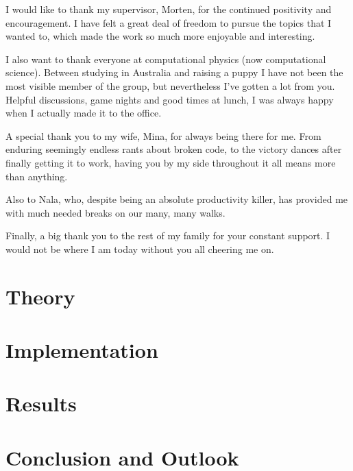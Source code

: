 \documentclass[twoside,english]{uiofysmaster}
\begin{document}
\begin{acknowledgements}
  I would like to thank my supervisor, Morten, for the continued positivity and
  encouragement. I have felt a great deal of freedom to pursue the topics that I
  wanted to, which made the work so much more enjoyable and interesting.

  I also want to thank everyone at computational physics (now computational
science). Between studying in Australia and raising a puppy I have not been the
most visible member of the group, but nevertheless I've gotten a lot from you.
Helpful discussions, game nights and good times at lunch, I was always happy
when I actually made it to the office.

  A special thank you to my wife, Mina, for always being there for me. From
  enduring seemingly endless rants about broken code, to the victory dances after
  finally getting it to work, having you by my side throughout it all means more
  than anything.

  Also to Nala, who, despite being an absolute productivity killer, has provided
  me with much needed breaks on our many, many walks.

  Finally, a big thank you to the rest of my family for your constant support. I
would not be where I am today without you all cheering me on.
\end{acknowledgements}

\tableofcontents

\listoffigures
\begingroup
\let\clearpage\relax
\listoftables
\endgroup



\part{Theory}
\label{prt:theory}





\part{Implementation}
\label{prt:implementation}




\part{Results}
\label{prt:results}


\part{Conclusion and Outlook}
\label{prt:conclusion}


\printglossary[title=List of Accronyms, toctitle=Terms and abbreviations,type=\acronymtype]

\printbibliography[heading=bibintoc, title={References}]
\end{document}
